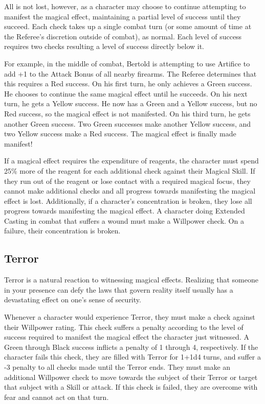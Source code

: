 \documentclass[oneside]{book}
\begin{document}
\begin{multicols}{2}
All is not lost, however, as a character may choose to continue attempting to manifest the magical effect, maintaining a partial level of success until they succeed. Each check takes up a single combat turn (or some amount of time at the Referee's discretion outside of combat), as normal. Each level of success requires two checks resulting a level of success directly below it. 

For example, in the middle of combat, Bertold is attempting to use Artifice to add +1 to the Attack Bonus of all nearby firearms. The Referee determines that this requires a Red success. On his first turn, he only achieves a Green success. He chooses to continue the same magical effect until he succeeds. On his next turn, he gets a Yellow success. He now has a Green and a Yellow success, but no Red success, so the magical effect is not manifested. On his third turn, he gets another Green success. Two Green successes make another Yellow success, and two Yellow success make a Red success. The magical effect is finally made manifest!

If a magical effect requires the expenditure of reagents, the character must spend 25\% more of the reagent for each additional check against their Magical Skill. If they run out of the reagent or lose contact with a required magical focus, they cannot make additional checks and all progress towards manifesting the magical effect is lost. Additionally, if a character's concentration is broken, they lose all progress towards manifesting the magical effect. A character doing Extended Casting in combat that suffers a wound must make a Willpower check. On a failure, their concentration is broken. 

\subsection{Terror}
Terror is a natural reaction to witnessing magical effects. Realizing that someone in your presence can defy the laws that govern reality itself usually has a devastating effect on one's sense of security. 

Whenever a character would experience Terror, they must make a check against their Willpower rating. This check suffers a penalty according to the level of success required to manifest the magical effect the character just witnessed. A Green through Black success inflicts a penalty of 1 through 4, respectively. If the character fails this check, they are filled with Terror for 1+1d4 turns, and suffer a -3 penalty to all checks made until the Terror ends. They must make an additional Willpower check to move towards the subject of their Terror or target that subject with a Skill or attack. If this check is failed, they are overcome with fear and cannot act on that turn.  

\end{multicols}
\end{document}
